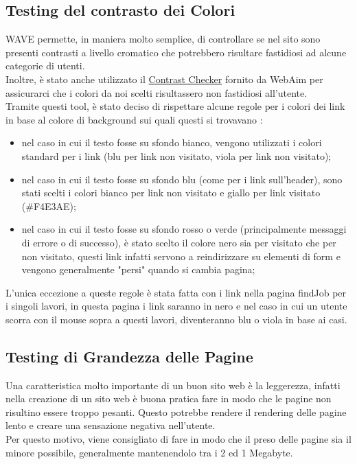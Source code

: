   \subsection{Testing del contrasto dei Colori} 
    WAVE permette, in maniera molto semplice, di controllare se nel sito sono presenti contrasti a livello cromatico che potrebbero risultare fastidiosi ad alcune categorie di utenti. \\
    Inoltre, è stato anche utilizzato il \href{https://webaim.org/resources/contrastchecker/}{Contrast Checker} fornito da WebAim per assicurarci che i colori da noi scelti risultassero non fastidiosi all'utente. \\
    Tramite questi tool, è stato deciso di rispettare alcune regole per i colori dei link in base al colore di background sui quali questi si trovavano :
    \begin{itemize}
      \item nel caso in cui il testo fosse su sfondo bianco, vengono utilizzati i colori standard per i link (blu per link non visitato, viola per link non visitato);
      \item nel caso in cui il testo fosse su sfondo blu (come per i link sull'header), sono stati scelti i colori bianco per link non visitato e giallo per link visitato \color{Yellow} (\#F4E3AE);\color{black}
      \item nel caso in cui il testo fosse su sfondo rosso o verde (principalmente messaggi di errore o di successo), è stato scelto il colore nero sia per visitato che per non visitato, questi link infatti servono a reindirizzare su elementi di form e vengono generalmente "persi" quando si cambia pagina;
    \end{itemize}
    L'unica eccezione a queste regole è stata fatta con i link nella pagina findJob per i singoli lavori, in questa pagina i link saranno in nero e nel caso in cui un utente scorra con il mouse sopra a questi lavori, diventeranno blu o viola in base ai casi.

  \subsection{Testing di Grandezza delle Pagine}
    Una caratteristica molto importante di un buon sito web è la leggerezza, infatti nella creazione di un sito web è buona pratica fare in modo che le pagine non risultino essere troppo pesanti. Questo potrebbe rendere il rendering delle pagine lento e creare una sensazione negativa nell'utente.\\
    Per questo motivo, viene consigliato di fare in modo che il preso delle pagine sia il minore possibile, generalmente mantenendolo tra i 2 ed 1 Megabyte. 

